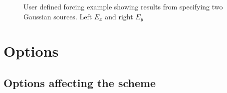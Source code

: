 \documentclass{article}
\begin{document}
{
\begin{figure}[hbt]
\newcommand{\figWidth}{7.5cm}
\newcommand{\trimfig}[2]{\trimFig{#1}{#2}{0.1}{0.05}{.05}{.05}}
\begin{center}
\end{center}
\caption{User defined forcing example showing results from specifying two Gaussian sources. Left $E_x$ and right $E_y$}
\label{fig:userDefinedForcingGuassianSources}
\end{figure}
}

% 




\clearpage
\section{Options} \label{sec:option}

\subsection{Options affecting the scheme}
\end{document}
